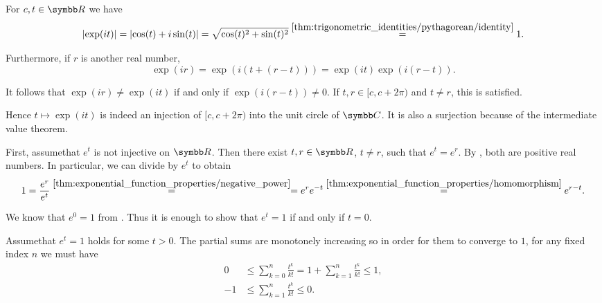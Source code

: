 \begin{RefListProof}
     For \( c, t \in \BR \) we have
    \begin{equation*}
      \left\vert \exp(it) \right\vert
      =
      \left\vert \cos(t) + i\sin(t) \right\vert
      =
      \sqrt{\cos(t)^2 + \sin(t)^2}
      \overset {\ref{thm:trigonometric_identities/pythagorean/identity}} =
      1.
    \end{equation*}

    Furthermore, if \( r \) is another real number,
    \begin{equation}
      \exp(ir)
      =
      \exp(i(t + (r - t)))
      =
      \exp(it) \exp(i(r - t)).
    \end{equation}

    It follows that \( \exp(ir) \neq \exp(it) \) if and only if \( \exp(i(r - t)) \neq 0 \). If \( t, r \in [c, c + 2\pi) \) and \( t \neq r \), this is satisfied.

    Hence \( t \mapsto \exp(it) \) is indeed an injection of \( [c, c + 2\pi) \) into the unit circle of \( \BC \). It is also a surjection because of the intermediate value theorem.

     First, assume\LEM that \( e^t \) is not injective on \( \BR \). Then there exist \( t, r \in \BR \), \( t \neq r \), such that \( e^t = e^r \). By , both are positive real numbers. In particular, we can divide by \( e^t \) to obtain
    \begin{equation*}
      1
      =
      \frac {e^r} {e^t}
      \overset {\ref{thm:exponential_function_properties/negative_power}} =
      =
      e^r e^{-t}
      \overset {\ref{thm:exponential_function_properties/homomorphism}} =
      e^{r - t}.
    \end{equation*}

    We know that \( e^0 = 1 \) from . Thus it is enough to show that \( e^t = 1 \) if and only if \( t = 0 \).

    Assume\LEM that \( e^t = 1 \) holds for some \( t > 0 \). The partial sums are monotonely increasing so in order for them to converge to \( 1 \), for any fixed index \( n \) we must have
    \begin{align*}
      0 &\leq \sum_{k=0}^n \frac {t^k} {k!} = 1 + \sum_{k=1}^n \frac {t^k} {k!} \leq 1,\\
      -1 &\leq \sum_{k=1}^n \frac {t^k} {k!} \leq 0.
    \end{align*}


\end{RefListProof}
